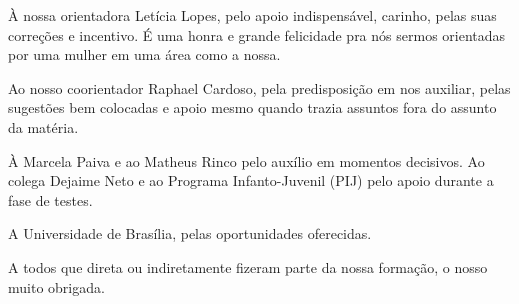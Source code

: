 À nossa orientadora Letícia Lopes, pelo apoio indispensável, carinho, pelas suas correções e incentivo. É uma honra e grande felicidade pra nós sermos orientadas por uma mulher em uma área como a nossa.

Ao nosso coorientador Raphael Cardoso, pela predisposição em nos auxiliar, pelas sugestões bem colocadas e apoio mesmo quando trazia assuntos fora do assunto da matéria.

À Marcela Paiva e ao Matheus Rinco pelo auxílio em momentos decisivos. Ao colega Dejaime Neto e ao Programa Infanto-Juvenil (PIJ) pelo apoio durante a fase de testes.

A Universidade de Brasília, pelas oportunidades oferecidas.

A todos que direta ou indiretamente fizeram parte da nossa formação, o nosso muito obrigada.